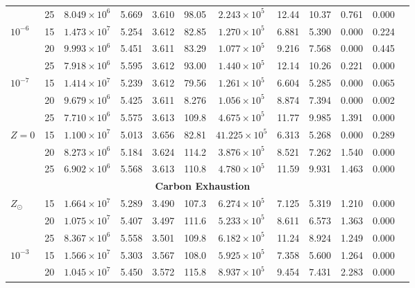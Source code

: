 {\begin{table}[h!]
{\begin{tabular}{lccccccccccc}
                    & 25 & $8.049 \times 10^6$  & 5.669 & 3.610 & 98.05 & $2.243 \times 10^5$ & 12.44  & 10.37  & 0.761  & 0.000  \\
        $10^{-6}$ & 15 & $1.473 \times 10^7$  & 5.254 & 3.612 & 82.85 & $1.270 \times 10^5$ & 6.881  & 5.390  & 0.000  & 0.224 \\
                    & 20 & $9.993 \times 10^6$  & 5.451 & 3.611 & 83.29 & $1.077 \times 10^5$ & 9.216  & 7.568  & 0.000  & 0.445 \\
                    & 25 & $7.918 \times 10^6$  & 5.595 & 3.612 & 93.00 & $1.440 \times 10^5$ & 12.14  & 10.26  & 0.221  & 0.000  \\
        $10^{-7}$ & 15 & $1.414 \times 10^7$  & 5.239 & 3.612 & 79.56 & $1.261 \times 10^5$ & 6.604  & 5.285  & 0.000  & 0.065 \\
                    & 20 & $9.679 \times 10^6$  & 5.425 & 3.611 & 8.276 & $1.056 \times 10^5$ & 8.874  & 7.394  & 0.000  & 0.002 \\
                    & 25 & $7.710 \times 10^6$  & 5.575 & 3.613 & 109.8 & $4.675 \times 10^5$ & 11.77  & 9.985  & 1.391  & 0.000  \\
        $Z=0$ & 15 & $1.100 \times 10^7$  & 5.013 & 3.656 & 82.81 & $41.225 \times 10^5$ & 6.313  & 5.268  & 0.000  & 0.289 \\
                    & 20 & $8.273 \times 10^6$  & 5.184 & 3.624 & 114.2 & $3.876 \times 10^5$ & 8.521  & 7.262  & 1.540  & 0.000  \\
                    & 25 & $6.902 \times 10^6$  & 5.568 & 3.613 & 110.8 & $4.780 \times 10^5$ & 11.59  & 9.931  & 1.463  & 0.000  \\
        \midrule
        \multicolumn{11}{c}{\textbf{ Carbon Exhaustion }} \\
        \midrule
        $Z_{\odot}$ & 15 & $1.664 \times 10^7$  & 5.289 & 3.490 & 107.3 & $6.274 \times 10^5$ & 7.125  & 5.319  & 1.210  & 0.000  \\
                    & 20 & $1.075 \times 10^7$  & 5.407 & 3.497 & 111.6 & $5.233 \times 10^5$ & 8.611  & 6.573  & 1.363  & 0.000  \\
                    & 25 & $8.367 \times 10^6$  & 5.558 & 3.501 & 109.8 & $6.182 \times 10^5$ & 11.24  & 8.924  & 1.249  & 0.000  \\
        $10^{-3}$   & 15 & $1.566 \times 10^7$  & 5.303 & 3.567 & 108.0 & $5.925 \times 10^5$ & 7.358  & 5.600  & 1.264  & 0.000  \\
                    & 20 & $1.045 \times 10^7$  & 5.450 & 3.572 & 115.8 & $8.937 \times 10^5$ & 9.454  & 7.431  & 2.283  & 0.000  \\

\end{tabular}}
\end{table}}
